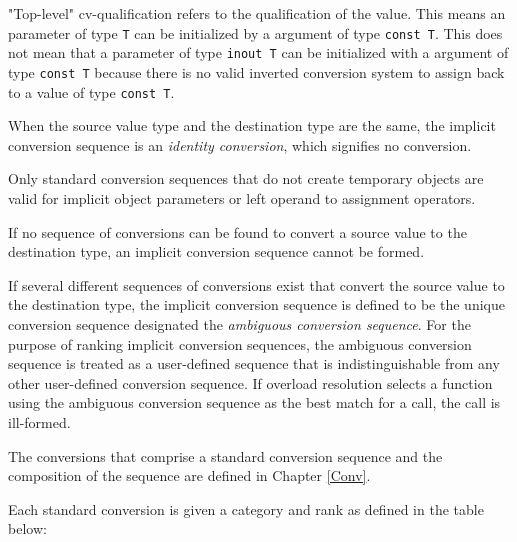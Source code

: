 \begin{note}
"Top-level" cv-qualification refers to the qualification of the value. This
means an parameter of type \texttt{T} can be initialized by a argument of type
\texttt{const T}. This does not mean that a parameter of type \texttt{inout T}
can be initialized with a argument of type \texttt{const T} because there is no
valid inverted conversion system to assign back to a value of type \texttt{const
T}.
\end{note}

\p When the source value type and the destination type are the same, the
implicit conversion sequence is an \textit{identity conversion}, which signifies
no conversion.

\p Only standard conversion sequences that do not create temporary objects are
valid for implicit object parameters or left operand to assignment operators.

\p If no sequence of conversions can be found to convert a source value to the
destination type, an implicit conversion sequence cannot be formed.

\p If several different sequences of conversions exist that convert the source
value to the destination type, the implicit conversion sequence is defined to be
the unique conversion sequence designated the \textit{ambiguous conversion sequence}.
For the purpose of ranking implicit conversion sequences, the
ambiguous conversion sequence is treated as a user-defined sequence that is
indistinguishable from any other user-defined conversion sequence. If overload
resolution selects a function using the ambiguous conversion sequence as the
best match for a call, the call is ill-formed.


\p The conversions that comprise a standard conversion sequence and the
composition of the sequence are defined in Chapter \ref{Conv}.

\p Each standard conversion is given a category and rank as defined in the table
below:

